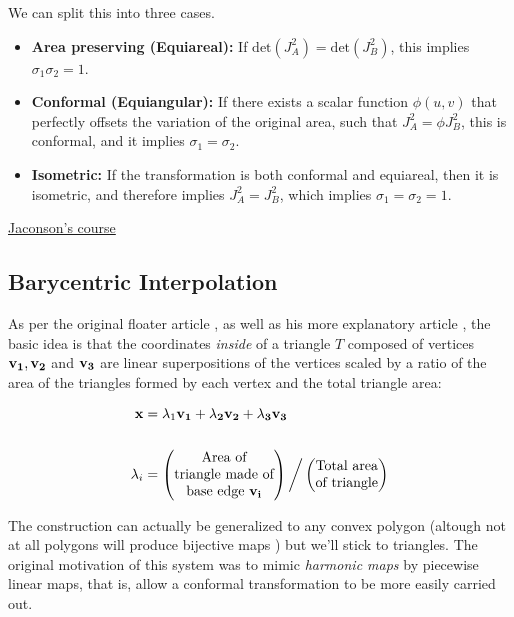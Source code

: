 We can split this into three cases.

\begin{itemize}
    \item \textbf{Area preserving (Equiareal):} 
    If $\text{det}(J_A^2)=\text{det}(J_B^2)$, this implies
    $\sigma_1 \sigma_2 = 1$.
    
    \item \textbf{Conformal (Equiangular):} If there exists a scalar function
    $\phi(u,v)$ that perfectly offsets the variation of the original
    area, such that $J_A^2 = \phi J_B^2$, this is conformal, and it
    implies $\sigma_1=\sigma_2$.
    
    \item \textbf{Isometric:} If the transformation is both
    conformal and equiareal, then it is isometric, and therefore implies
    $J^2_A = J^2_B$, which implies $\sigma_1=\sigma_2=1$.
\end{itemize}

\href{https://github.com/alecjacobson/geometry-processing-parameterization}{Jaconson's course}

\subsection{Barycentric Interpolation}

As per the original floater article \cite{floater1}, as well
as his more explanatory article \cite{floater2}, the basic idea is that
the coordinates \emph{inside} of a triangle $T$ composed of vertices
$\bf{v_1, v_2}$ and $\bf{v_3}$ are linear superpositions of the
vertices scaled by a ratio of the area of the triangles formed by each
vertex and the total triangle area:


\begin{align*}
\bf{x} &= \lambda_1 \bf{v_1} + \lambda_2 \bf{v_2} 
+ \lambda_3 \bf{v_3} \\
\\
\lambda_i&=
\begin{pmatrix}
\text{Area of} \\
\text{triangle made of} \\
\text{base edge } \bf{v}_i
\end{pmatrix}
\bigg/
\begin{pmatrix}
\text{Total area} \\
\text{of triangle}
\end{pmatrix}
\end{align*}

The construction can actually be generalized to any convex polygon
(altough not at all polygons will produce bijective maps \cite{barycentric1})
but we'll stick to triangles. The original motivation of this
system was to mimic \emph{harmonic maps} by piecewise linear maps, that
is, allow a conformal transformation to be more easily carried out.

